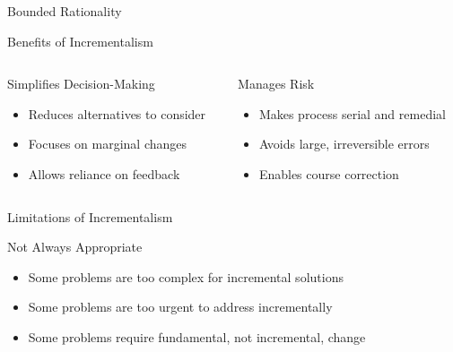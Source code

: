 \documentclass[10pt]{beamer}
\begin{document}
\begin{frame}{Bounded Rationality}
\begin{frame}{Benefits of Incrementalism}
\begin{columns}
\begin{column}{0.5\textwidth}
\begin{block}{Simplifies Decision-Making}
\begin{itemize}
\item Reduces alternatives to consider
\item Focuses on marginal changes
\item Allows reliance on feedback
\end{itemize}
\end{block}
\end{column}
\begin{column}{0.5\textwidth}
\begin{block}{Manages Risk}
\begin{itemize}
\item Makes process serial and remedial
\item Avoids large, irreversible errors
\item Enables course correction
\end{itemize}
\end{block}
\end{column}
\end{columns}

\vspace{1cm}
\begin{center}
\end{center}
\end{frame}

\begin{frame}{Limitations of Incrementalism}
\begin{block}{Not Always Appropriate}
\begin{itemize}
\item Some problems are too complex for incremental solutions
\item Some problems are too urgent to address incrementally
\item Some problems require fundamental, not incremental, change
\end{itemize}
\end{block}


\end{frame}
\end{frame}
\end{document}
